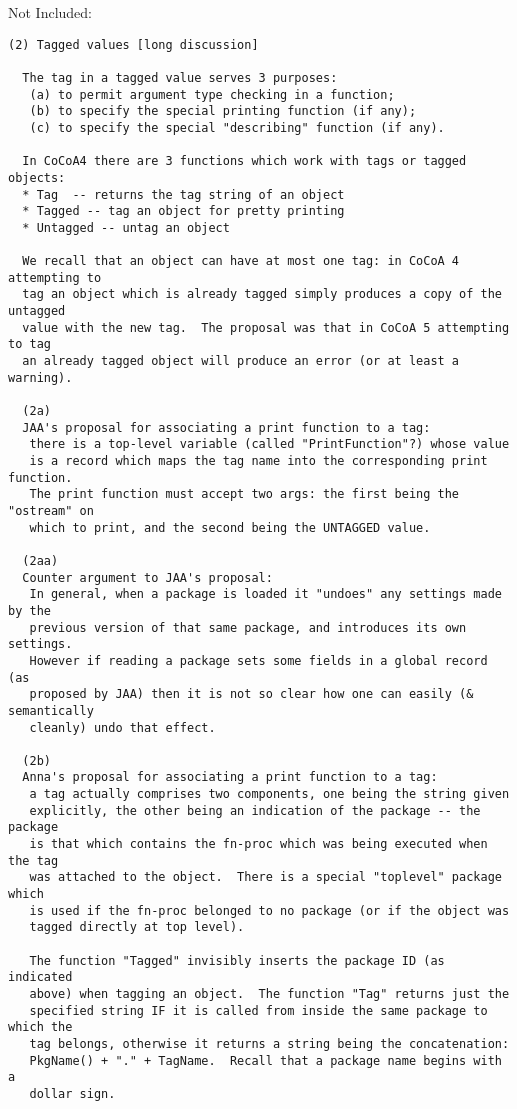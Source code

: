 \documentclass{book}[12,a4paper]
\def\refandpage#1{{\ref{#1}, pg.\pageref{#1}}}
\begin{document}
Not Included: %
\begin{verbatim}
(2) Tagged values [long discussion]

  The tag in a tagged value serves 3 purposes:
   (a) to permit argument type checking in a function;
   (b) to specify the special printing function (if any);
   (c) to specify the special "describing" function (if any).

  In CoCoA4 there are 3 functions which work with tags or tagged objects:
  * Tag  -- returns the tag string of an object
  * Tagged -- tag an object for pretty printing
  * Untagged -- untag an object

  We recall that an object can have at most one tag: in CoCoA 4 attempting to
  tag an object which is already tagged simply produces a copy of the untagged
  value with the new tag.  The proposal was that in CoCoA 5 attempting to tag
  an already tagged object will produce an error (or at least a warning).

  (2a)
  JAA's proposal for associating a print function to a tag:
   there is a top-level variable (called "PrintFunction"?) whose value
   is a record which maps the tag name into the corresponding print function.
   The print function must accept two args: the first being the "ostream" on
   which to print, and the second being the UNTAGGED value.

  (2aa)
  Counter argument to JAA's proposal:
   In general, when a package is loaded it "undoes" any settings made by the
   previous version of that same package, and introduces its own settings.
   However if reading a package sets some fields in a global record (as
   proposed by JAA) then it is not so clear how one can easily (& semantically
   cleanly) undo that effect.

  (2b)
  Anna's proposal for associating a print function to a tag:
   a tag actually comprises two components, one being the string given
   explicitly, the other being an indication of the package -- the package
   is that which contains the fn-proc which was being executed when the tag
   was attached to the object.  There is a special "toplevel" package which
   is used if the fn-proc belonged to no package (or if the object was
   tagged directly at top level).

   The function "Tagged" invisibly inserts the package ID (as indicated
   above) when tagging an object.  The function "Tag" returns just the
   specified string IF it is called from inside the same package to which the
   tag belongs, otherwise it returns a string being the concatenation:
   PkgName() + "." + TagName.  Recall that a package name begins with a
   dollar sign.


\end{verbatim}
\end{document}
